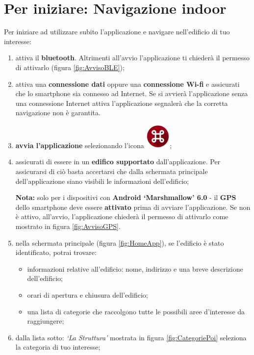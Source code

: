 \documentclass[../ClipsManualeUtente.tex]{subfiles}
\begin{document}
\section{Per iniziare: Navigazione indoor}
	Per iniziare ad utilizzare subito l'applicazione e navigare nell'edificio di tuo interesse:
	\begin{enumerate}
		\item attiva il \textbf{bluetooth}. Altrimenti all'avvio l'applicazione ti chiederà il permesso di attivarlo (figura \ref{fig:AvvisoBLE});
		\item attiva una \textbf{connessione dati} oppure una \textbf{connessione Wi-fi} e assicurati che lo smartphone sia connesso ad Internet. Se si avvierà l'applicazione senza una connessione Internet attiva l'applicazione segnalerà che la corretta navigazione non è garantita.
		\item \textbf{avvia l'applicazione} selezionando l'icona \includegraphics[scale=0.4]{img/LogoApp};
		\item assicurati di essere in un \textbf{edifico supportato} dall'applicazione. Per assicurarsi di ciò basta accertarsi che dalla schermata principale dell'applicazione siano visibili le informazioni dell'edificio;
		
		\begin{framed}
			\textbf{Nota:} solo per i dispositivi con \textbf{Android `Marshmallow' 6.0} - il \textbf{GPS} dello smartphone deve essere \textbf{attivato} prima di avviare l'applicazione. Se non è attivo, all'avvio, l'applicazione chiederà il permesso di attivarlo come mostrato in figura \ref{fig:AvvisoGPS}.
		\end{framed}
		
		\item nella schermata principale (figura \ref{fig:HomeApp}), se l'edificio è stato identificato, potrai trovare:
		\begin{itemize}
			\item informazioni relative all'edificio: nome, indirizzo e una breve descrizione dell'edificio;
			\item orari di apertura e chiusura dell'edificio;
			\item una lista di categorie che raccolgono tutte le possibili aree d'interesse da raggiungere;
		\end{itemize}
		\item dalla lista sotto: \textit{`La Struttura'} mostrata in figura \ref{fig:CategoriePoi} seleziona la categoria di tuo interesse;
		

\end{enumerate}
\end{document}
